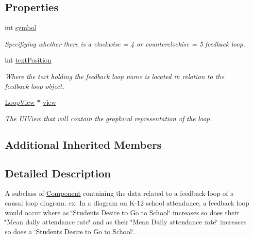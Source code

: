 \subsection*{Properties}
\begin{DoxyCompactItemize}
\item 
\hypertarget{interface_feedback_loop_a52584f3c190fabcb0171a7e7d4e3bb30}{int \hyperlink{interface_feedback_loop_a52584f3c190fabcb0171a7e7d4e3bb30}{symbol}}\label{interface_feedback_loop_a52584f3c190fabcb0171a7e7d4e3bb30}

\begin{DoxyCompactList}\small\item\em Specifiying whether there is a clockwise = 4 or counterclockise = 5 feedback loop. \end{DoxyCompactList}\item 
\hypertarget{interface_feedback_loop_a0e3597199260a059ec632e5d54adb06e}{int \hyperlink{interface_feedback_loop_a0e3597199260a059ec632e5d54adb06e}{text\-Position}}\label{interface_feedback_loop_a0e3597199260a059ec632e5d54adb06e}

\begin{DoxyCompactList}\small\item\em Where the text holding the feedback loop name is located in relation to the feedback loop object. \end{DoxyCompactList}\item 
\hypertarget{interface_feedback_loop_a46b809706af30aafdb3ff35b2173286b}{\hyperlink{interface_loop_view}{Loop\-View} $\ast$ \hyperlink{interface_feedback_loop_a46b809706af30aafdb3ff35b2173286b}{view}}\label{interface_feedback_loop_a46b809706af30aafdb3ff35b2173286b}

\begin{DoxyCompactList}\small\item\em The U\-I\-View that will contain the graphical representation of the loop. \end{DoxyCompactList}\end{DoxyCompactItemize}
\subsection*{Additional Inherited Members}


\subsection{Detailed Description}
A subclass of \hyperlink{interface_component}{Component} containing the data related to a feedback loop of a causal loop diagram. ex. In a diagram on K-\/12 school attendance, a feedback loop would occur where as \char`\"{}\-Students Desire to Go to School\char`\"{} increases so does their \char`\"{}\-Mean daily attendance rate\char`\"{} and as their \char`\"{}\-Mean Daily attendance rate\char`\"{} increases so does a \char`\"{}\-Students Desire to Go to School\char`\"{}. 

